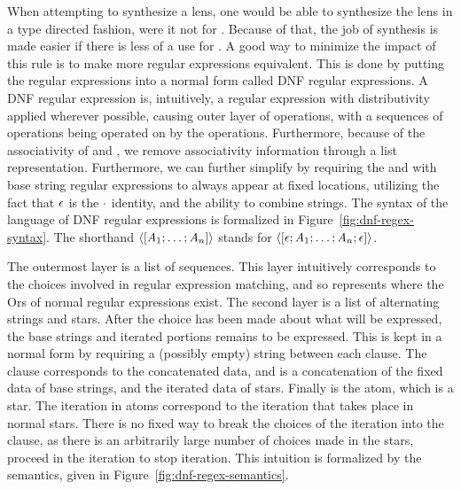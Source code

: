 When attempting to synthesize a lens, one would be able to synthesize the lens
in a type directed fashion, were it not for \RewriteRegexLensRule{}.
Because of that, the job of synthesis is made easier if there is less of a use
for \RewriteRegexLensRule{}.
A good way to minimize the impact of this rule is to make more
regular expressions equivalent.  This is done by putting the regular expressions
into a normal form called DNF regular expressions.
A DNF regular expression is, intuitively, a regular expression with
distributivity applied wherever possible, causing outer layer of \Or{} operations,
with a sequences of \Concat{} operations being operated on by the \Or{} operations.
Furthermore, because of the associativity of \Or{} and \Concat{}, we
remove associativity information through a list representation.
Furthermore, we can further simplify by requiring the
and with base string regular expressions to always appear at fixed locations,
utilizing the fact that $\epsilon{}$ is the $\cdot$ identity, and
the ability to combine strings.
The syntax of the language of DNF regular expressions is formalized in Figure~\ref{fig:dnf-regex-syntax}.
The shorthand $\langle[\mathit{A}_1;\ldots;\mathit{A}_n]\rangle$
stands for
$\langle[\epsilon;\mathit{A}_1;\ldots;\mathit{A}_n;\epsilon]\rangle$.

The outermost layer is a list of sequences.
This layer intuitively corresponds to the choices involved in regular expression matching, and so represents where the Ors of normal regular expressions exist.
The second layer is a list of alternating strings and stars.
After the choice has been made about what will be expressed,
the base strings and iterated portions remains to be expressed.
This is kept in a normal form by requiring a (possibly empty) string between
each clause.
The clause corresponds to the concatenated data, and is a concatenation of the
fixed data of base strings, and the iterated data of stars.
Finally is the atom, which is a star.
The iteration in atoms correspond to the iteration that takes place in normal stars.
There is no fixed way to break the choices of the iteration into the clause,
as there is an arbitrarily large number of choices made in the stars, proceed
in the iteration to stop iteration.
This intuition is formalized by the semantics, given in
Figure~\ref{fig:dnf-regex-semantics}.

